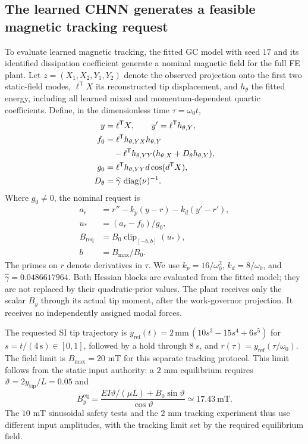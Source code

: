 \subsection{The learned CHNN generates a feasible magnetic tracking request}
\label{sec:unifiedlearnedcontrol}
To evaluate learned magnetic tracking, the fitted GC model
with seed $17$ and its identified dissipation coefficient generate a nominal
magnetic field for the full FE plant.  Let $z=(X_1,X_2,Y_1,Y_2)$ denote
the observed projection onto the first two static-field modes,
$\ell^{\mathsf T}X$ its reconstructed tip displacement, and
$h_\theta$ the fitted energy, including all learned mixed and
momentum-dependent quartic coefficients.  Define, in the dimensionless
time $\tau=\omega_0t$,
\begin{align}
 y&=\ell^{\mathsf T}X,\qquad
 y'=\ell^{\mathsf T}h_{\theta,Y},\\
 f_0&=\ell^{\mathsf T}h_{\theta,YX}h_{\theta,Y}\notag\\
 &\quad-\ell^{\mathsf T}h_{\theta,YY}
       (h_{\theta,X}+D_\theta h_{\theta,Y}),\\
 g_0&=\ell^{\mathsf T}h_{\theta,YY}d\cos(d^{\mathsf T}X),\\
 D_\theta&=\widehat\gamma\,\operatorname{diag}(\nu)^{-1}.
 \label{eq:unifiedlearnedoutput}
\end{align}
Where $g_0\ne0$, the nominal request is
\begin{align}
 a_r&=r''-k_p(y-r)-k_d(y'-r'),\\
 u_*&=(a_r-f_0)/g_0,\\
 B_{\mathrm{req}}&=B_0\operatorname{clip}_{[-b,b]}(u_*),\\
 b&=B_{\max}/B_0.
 \label{eq:unifiedlearnednominal}
\end{align}
The primes on $r$ denote derivatives in $\tau$.  We use
$k_p=16/\omega_0^2$, $k_d=8/\omega_0$, and
$\widehat\gamma=0.0486617964$.  Both Hessian blocks are evaluated from
the fitted model; they are not replaced by their quadratic-prior values.
The plant receives only the scalar $B_y$ through its actual tip moment,
after the work-governor projection.  It receives no independently
assigned modal forces.

The requested SI tip trajectory is
$y_{\mathrm{ref}}(t)=2\,\mathrm{mm}\,(10s^3-15s^4+6s^5)$ for
$s=t/(4\,\mathrm{s})\in[0,1]$, followed by a hold through $8$ s, and
$r(\tau)=y_{\mathrm{ref}}(\tau/\omega_0)$.
The field limit is $B_{\max}=20$ mT for this separate tracking protocol.
This limit follows from the static input authority: a $2$ mm
equilibrium requires $\vartheta=2y_{\mathrm{tip}}/L=0.05$ and
\begin{equation}
 B_y^{\mathrm{eq}}=
 \frac{EI\vartheta/(\mu L)+B_0\sin\vartheta}{\cos\vartheta}
 \simeq17.43\ \mathrm{mT}.
 \label{eq:unifiedstaticreach}
\end{equation}
The $10$ mT sinusoidal safety tests and the $2$ mm tracking experiment
thus use different input amplitudes, with the tracking limit set by the
required equilibrium field.

